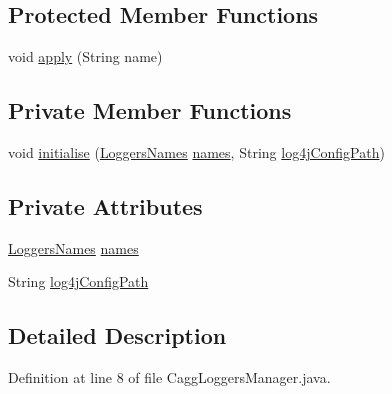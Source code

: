 \subsection*{Protected Member Functions}
\begin{DoxyCompactItemize}
\item 
void \hyperlink{classit_1_1emarolab_1_1cagg_1_1debugging_1_1CaggLoggersManager_a35a88e96a38674e7cea62441eccfbe80}{apply} (String name)
\end{DoxyCompactItemize}
\subsection*{Private Member Functions}
\begin{DoxyCompactItemize}
\item 
void \hyperlink{classit_1_1emarolab_1_1cagg_1_1debugging_1_1CaggLoggersManager_ab8b06a5c5ef66c393bdd3214f2b18da9}{initialise} (\hyperlink{classit_1_1emarolab_1_1cagg_1_1debugging_1_1CaggLoggersManager_1_1LoggersNames}{Loggers\-Names} \hyperlink{classit_1_1emarolab_1_1cagg_1_1debugging_1_1CaggLoggersManager_a8ccc2bba0040061f968631227b15c5fa}{names}, String \hyperlink{classit_1_1emarolab_1_1cagg_1_1debugging_1_1CaggLoggersManager_a833228399db3ceab30d89f46722a4e08}{log4j\-Config\-Path})
\end{DoxyCompactItemize}
\subsection*{Private Attributes}
\begin{DoxyCompactItemize}
\item 
\hyperlink{classit_1_1emarolab_1_1cagg_1_1debugging_1_1CaggLoggersManager_1_1LoggersNames}{Loggers\-Names} \hyperlink{classit_1_1emarolab_1_1cagg_1_1debugging_1_1CaggLoggersManager_a8ccc2bba0040061f968631227b15c5fa}{names}
\item 
String \hyperlink{classit_1_1emarolab_1_1cagg_1_1debugging_1_1CaggLoggersManager_a833228399db3ceab30d89f46722a4e08}{log4j\-Config\-Path}
\end{DoxyCompactItemize}


\subsection{Detailed Description}


Definition at line 8 of file Cagg\-Loggers\-Manager.\-java.




